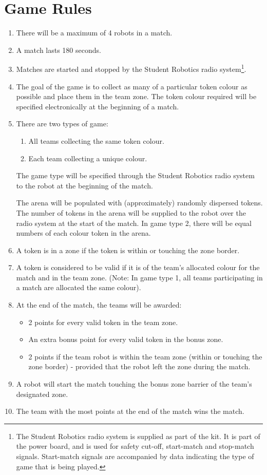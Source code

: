 \section {Game Rules}
\label{game-rules}

\begin{enumerate}
\item There will be a maximum of 4 robots in a match.
\item A match lasts 180 seconds.
\item Matches are started and stopped by the Student Robotics radio system\footnote{The Student Robotics radio system is supplied as part of the kit.  It is part of the power board, and is used for safety cut-off, start-match and stop-match signals.  Start-match signals are accompanied by data indicating the type of game that is being played.}.
\item The goal of the game is to collect as many of a particular token colour as possible and place them in the team zone.  The token colour required will be specified electronically at the beginning of a match.
\item There are two types of game:
  \renewcommand{\labelenumii}{\arabic{enumii}.}
  \begin{enumerate}
  \item All teams collecting the same token colour.
  \item Each team collecting a unique colour. 
  \end{enumerate}
The game type will be specified through the Student Robotics radio system to the robot at the beginning of the match.

The arena will be populated with (approximately) randomly dispersed tokens.  The number of tokens in the arena will be supplied to the robot over the radio system at the start of the match.  In game type 2, there will be equal numbers of each colour token in the arena.

\item A token is in a zone if the token is within or touching the zone border.
\item A token is considered to be valid if it is of the team's allocated colour for the match and in the team zone.  (Note: In game type 1, all teams participating in a match are allocated the same colour).
\item At the end of the match, the teams will be awarded:
  \begin{itemize}
  \item 2 points for every valid token in the team zone.
  \item An extra bonus point for every valid token in the bonus zone.
  \item 2 points if the team robot is within the team zone (within or touching the zone border) - provided that the robot left the zone during the match.
  \end{itemize}
\item A robot will start the match touching the bonus zone barrier of the team's designated zone.
\item The team with the most points at the end of the match wins the match.
\end{enumerate}
